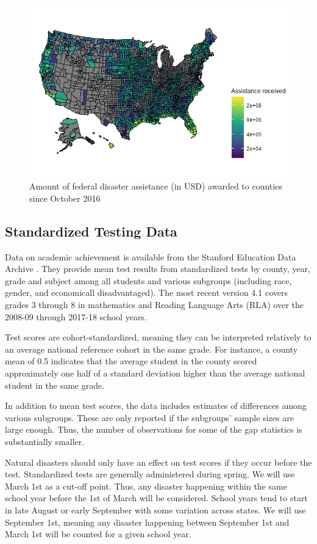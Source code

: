 \begin{figure}[!h]
	\centering
	\includegraphics[scale=0.7]{"../Code & Data/AssistanceMap.png"}
	\caption{Amount of federal disaster assistance (in USD) awarded to counties since October 2016}
	\label{AssistanceMap}
\end{figure}




\subsection{Standardized Testing Data}

Data on academic achievement is available from the Stanford Education Data Archive \citep{SEDA}. They provide mean test results from standardized tests by county, year, grade and subject among all students and various subgroups (including race, gender, and economicall disadvantaged). The most recent version 4.1 covers grades 3 through 8 in mathematics and Reading Language Arts (RLA) over the 2008-09 through 2017-18 school years.

Test scores are cohort-standardized, meaning they can be interpreted relatively to an average national reference cohort in the same grade. For instance, a county mean of 0.5 indicates that the average student in the county scored approximately one half of a standard deviation higher than the average national student in the same grade.

In addition to mean test scores, the data includes estimates of differences among various subgroups. These are only reported if the subgroups' sample sizes are large enough. Thus, the number of observations for some of the gap statistics is substantially smaller.

Natural disasters should only have an effect on test scores if they occur before the test. Standardized tests are generally administered during spring. We will use March 1st as a cut-off point. Thus, any disaster happening within the same school year before the 1st of March will be considered. School years tend to start in late August or early September with some variation across states. We will use September 1st, meaning any disaster happening between September 1st and March 1st will be counted for a given school year.







